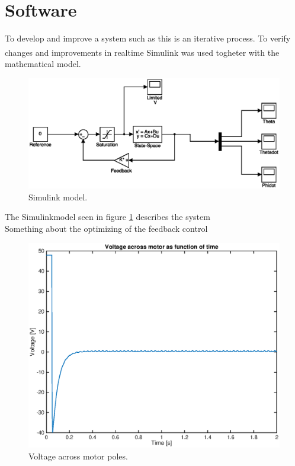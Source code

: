 \documentclass[a4paper,11pt]{kth-mag}
\begin{document}
\section{Software}
To develop and improve a system such as this is an iterative process. To verify changes and improvements in realtime Simulink\textsuperscript{\textregistered} was used togheter with the mathematical model. 
\begin{figure}[!htb]
\centering
\includegraphics[scale=.7]{simmodel.eps}
\caption{Simulink model.}
\label{fig:simmodel}
\end{figure}
The Simulinkmodel seen in figure \ref{fig:simmodel} describes the system
\\ Something about the optimizing of the feedback control
\begin{figure}[!htb]
\centering
\includegraphics[scale=.7]{voltageplot.eps}
\caption{Voltage across motor poles.}
\label{fig:voltageplot}
\end{figure}
\end{document}
